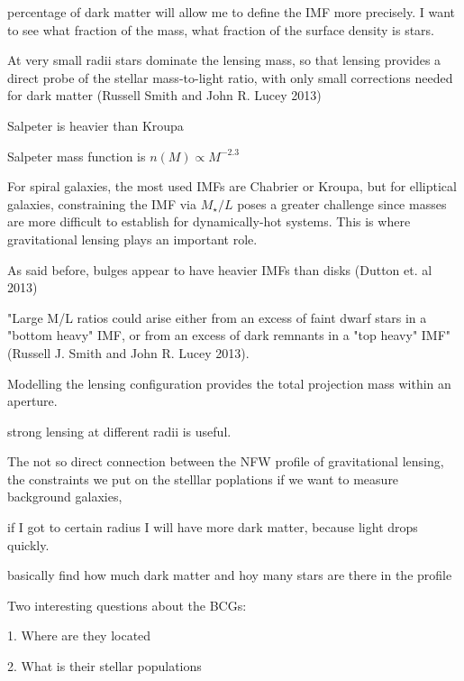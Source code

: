 percentage of dark matter will allow me to define the IMF more precisely. I want to see what fraction of the mass, what fraction of the surface density is stars. 

At very small radii stars dominate the lensing mass, so that lensing provides a direct probe of the stellar mass-to-light ratio, with only small corrections needed for dark matter (Russell Smith and John R. Lucey 2013)

Salpeter is heavier than Kroupa 

Salpeter mass function is $n(M)\propto M^{-2.3}$ 

For spiral galaxies, the most used IMFs are Chabrier or Kroupa, but for elliptical galaxies, constraining the IMF via $M_{\star}/L$ poses a greater challenge since masses are more difficult to establish for dynamically-hot systems. This is where gravitational lensing plays an important role.

As said before, bulges appear to have heavier IMFs than disks (Dutton et. al 2013)

"Large M/L ratios could arise either from an excess of faint dwarf stars in a "bottom heavy" IMF, or from an excess of dark remnants in a "top heavy" IMF" (Russell J. Smith and John R. Lucey 2013).

Modelling the lensing configuration provides the total projection mass within an aperture.

strong lensing at different radii is useful.

The not so direct connection between the NFW profile of gravitational lensing, the constraints we put on the stelllar poplations if we want to measure background galaxies, 

if I got to certain radius I will have more dark matter, because light drops quickly. 

basically find how much dark matter and hoy many stars are there in the profile

Two interesting questions about the BCGs:

1. Where are they located

2. What is their stellar populations




\newpage
